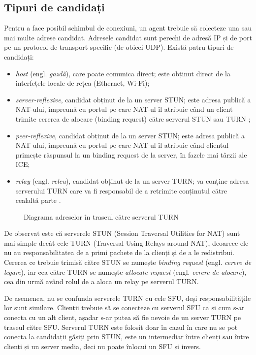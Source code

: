 \subsection{Tipuri de candidați}
\indent \par Pentru a face posibil schimbul de conexiuni, un agent trebuie să colecteze una sau mai multe adrese candidat. Adresele candidat sunt perechi de adresă IP și de port pe un protocol de transport specific (de obicei UDP). Există patru tipuri de candidați:
\begin{itemize}
    \item \textit{host} (engl. \textit{gazdă}), care poate comunica direct; este obținut direct de la interfețele locale de rețea (Ethernet, Wi-Fi);
    \item \textit{server-reflexive}, candidat obținut de la un server STUN; este adresa publică a NAT-ului, împreună cu portul pe care NAT-ul îl atribuie când un client trimite cererea de alocare (binding request) către serverul STUN sau TURN \cite{rfc5245};
    \item \textit{peer-reflexive}, candidat obținut de la un server STUN; este adresa publică a NAT-ului, împreună cu portul pe care NAT-ul îl atribuie când clientul primește răspunsul la un binding request de la server, în fazele mai târzii ale ICE;
    \item \textit{relay} (engl. \textit{releu}), candidat obținut de la un server TURN; va conține adresa serverului TURN care va fi responsabil de a retrimite conținutul către cealaltă parte \cite{rfc5245}.
\end{itemize}
\begin{figure}[H]
    \centering
    \scalebox{0.7}{}
    \caption{Diagrama adreselor în traseul către serverul TURN}
\end{figure}
\indent \par De observat este că serverele STUN (Session Traversal Utilities for NAT) sunt mai simple decât cele TURN (Traversal Using Relays around NAT), deoarece ele nu au responsabilitatea de a primi pachete de la clienți și de a le redistribui. Cererea ce trebuie trimisă către STUN se numește \textit{binding request} (engl. \textit{cerere de legare}), iar cea către TURN se numește \textit{allocate request} (engl. \textit{cerere de alocare}), cea din urmă având rolul de a aloca un relay pe serverul TURN. 
\indent \par De asemenea, nu se confunda serverele TURN cu cele SFU, deși responsabilitățile lor sunt similare. Clienții trebuie să se conecteze cu serverul SFU ca și cum s-ar conecta cu un alt client, așadar s-ar putea să fie nevoie de un server TURN pe traseul către SFU. Serverul TURN este folosit doar în cazul în care nu se pot conecta la candidații găsiți prin STUN, este un intermediar între clienți sau între clienți și un server media, deci nu poate înlocui un SFU și invers.
